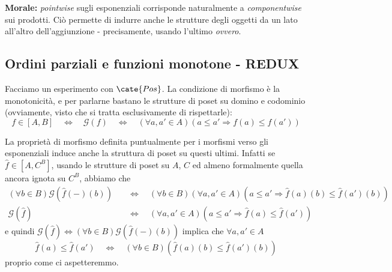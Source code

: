 {\bf Morale:} {\it pointwise} sugli esponenziali corrisponde naturalmente a {\it componentwise} sui prodotti. Ciò permette di indurre anche le strutture degli oggetti da un lato all'altro dell'aggiunzione - precisamente, usando l'ultimo {\it ovvero}.
\hypertarget{componentwise-pointwise}{}




\subsection*{Ordini parziali e funzioni monotone - REDUX}

Facciamo un esperimento con $\cate{Pos}$. La condizione di morfismo è la monotonicità, e per parlarne bastano le strutture di poset su domino e codominio (ovviamente, visto che si tratta esclusivamente di rispettarle):
\[
f \in [A,B]
\quad\Leftrightarrow\quad
{\mathcal G}(f)
\quad\Leftrightarrow\quad
(\forall a,a' \in A) (a \leq a' \Rightarrow f(a) \leq f(a'))
\]

La proprietà di morfismo definita puntualmente per i morfismi verso gli esponenziali induce anche la struttura di poset su questi ultimi. Infatti se $\hat{f}\in\left[A,C^B\right]$, usando le strutture di poset su $A$, $C$ ed almeno formalmente quella ancora ignota su $C^B$, abbiamo che
\begin{align*}
(\forall b\in B){\mathcal G}(\hat{f}(-)(b))
& \quad\Leftrightarrow\quad
(\forall b\in B)(\forall a,a' \in A) (a \leq a' \Rightarrow \hat{f}(a)(b) \leq \hat{f}(a')(b)) \\
{\mathcal G}(\hat{f})
& \quad\Leftrightarrow\quad
(\forall a,a' \in A) (a \leq a' \Rightarrow \hat{f}(a) \leq \hat{f}(a'))
\end{align*}
e quindi ${\mathcal G}(\hat{f})\Leftrightarrow(\forall b\in B){\mathcal G}(\hat{f}(-)(b))$ implica che $\forall a,a' \in A$
\[
\hat{f}(a) \leq \hat{f}(a')
\quad\Leftrightarrow\quad
(\forall b\in B)(\hat{f}(a)(b) \leq \hat{f}(a')(b))
\]
proprio come ci aspetteremmo.

